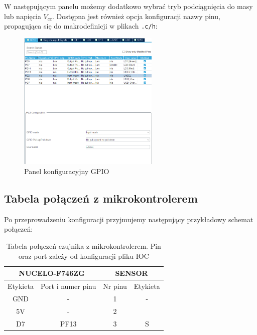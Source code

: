 \documentclass[11pt, a4paper]{article}
\begin{document}
\newpage

W następującym panelu możemy dodatkowo wybrać tryb podciągnięcia do masy lub napięcia $V_{cc}$.
Dostępna jest również opcja konfiguracji nazwy pinu, propagująca się do makrodefinicji w plikach \texttt{.c/h}:
\begin{figure}[h!]
    \centering
    \includegraphics[width=0.6\textwidth]{IMAGES/input_konf.png}
    \caption{Panel konfiguracyjny GPIO}
\end{figure}

\subsection* {Tabela połączeń z mikrokontrolerem}
Po przeprowadzeniu konfiguracji przyjmujemy następujący przykładowy schemat połączeń:

\vspace{0.5cm}
\begin{table}[h!]
    \centering
    \begin{tabular}{|c|c|c|c|} 
        \hline
        \multicolumn{2}{|c|}{NUCELO-F746ZG} & \multicolumn{2}{c|}{SENSOR}   \\ 
        \hline
        Etykieta & Port i numer pinu        & Nr pinu & Etykieta            \\ 
        \hline
        GND     & -                         & 1       & -                   \\
        5V      & -                         & 2       &                     \\
        D7      & PF13                      & 3       & S                   \\
        \hline
    \end{tabular}
    \caption{Tabela połączeń czujnika z mikrokontrolerem. Pin oraz port zależy od konfiguracji pliku IOC}
\end{table}
\vspace{0.5cm}
\end{document}
